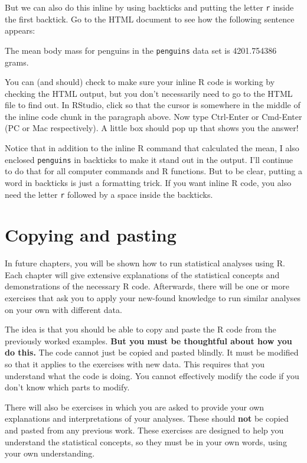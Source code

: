\documentclass[
]{book}
\begin{document}
But we can also do this inline by using backticks and putting the letter \texttt{r} inside the first backtick. Go to the HTML document to see how the following sentence appears:

The mean body mass for penguins in the \texttt{penguins} data set is 4201.754386 grams.

You can (and should) check to make sure your inline R code is working by checking the HTML output, but you don't necessarily need to go to the HTML file to find out. In RStudio, click so that the cursor is somewhere in the middle of the inline code chunk in the paragraph above. Now type Ctrl-Enter or Cmd-Enter (PC or Mac respectively). A little box should pop up that shows you the answer!

Notice that in addition to the inline R command that calculated the mean, I also enclosed \texttt{penguins} in backticks to make it stand out in the output. I'll continue to do that for all computer commands and R functions. But to be clear, putting a word in backticks is just a formatting trick. If you want inline R code, you also need the letter \texttt{r} followed by a space inside the backticks.

\hypertarget{rmark-copypaste}{%
\section{Copying and pasting}\label{rmark-copypaste}}

In future chapters, you will be shown how to run statistical analyses using R. Each chapter will give extensive explanations of the statistical concepts and demonstrations of the necessary R code. Afterwards, there will be one or more exercises that ask you to apply your new-found knowledge to run similar analyses on your own with different data.

The idea is that you should be able to copy and paste the R code from the previously worked examples. \textbf{But you must be thoughtful about how you do this.} The code cannot just be copied and pasted blindly. It must be modified so that it applies to the exercises with new data. This requires that you understand what the code is doing. You cannot effectively modify the code if you don't know which parts to modify.

There will also be exercises in which you are asked to provide your own explanations and interpretations of your analyses. These should \textbf{not} be copied and pasted from any previous work. These exercises are designed to help you understand the statistical concepts, so they must be in your own words, using your own understanding.
\end{document}
